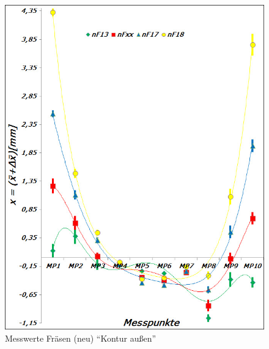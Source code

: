 \documentclass[12pt,a4paper,parskip]{scrartcl}
\begin{document}
\begin{figure}[hbtp]
\centering
\includegraphics[width=.8\textwidth]{fraesneumess}
\caption{Messwerte Fräsen (neu) "`Kontur außen"'}
\label{fig:fraesneumess}
\end{figure}
\end{document}
